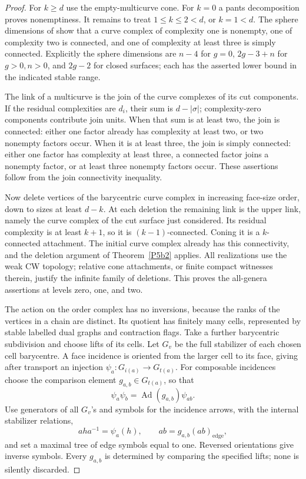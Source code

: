 \begin{proof}
For \(k\geq d\) use the empty-multicurve cone. For \(k=0\)
a pants decomposition proves nonemptiness. It remains to
treat \(1\leq k\leq2<d\), or \(k=1<d\).
The sphere dimensions of \citet[Chapter 4, Theorem 4.1]{Harer1988}
show that a curve complex of complexity one is nonempty, one of
complexity two is connected, and one of complexity at least three
is simply connected. Explicitly the sphere dimensions are \(n-4\)
for \(g=0\), \(2g-3+n\) for \(g>0,n>0\), and \(2g-2\)
for closed surfaces; each has the asserted lower bound
in the indicated stable range.

The link of a multicurve is the join of the curve complexes
of its cut components. If the residual complexities are
\(d_i\), their sum is \(d-|\sigma|\); complexity-zero
components contribute join units. When that sum is at
least two, the join is connected: either one factor
already has complexity at least two, or two nonempty
factors occur. When it is at least three, the join is
simply connected: either one factor has complexity at
least three, a connected factor joins a nonempty factor,
or at least three nonempty factors occur. These assertions
follow from the join connectivity inequality.

Now delete vertices of the barycentric curve complex in
increasing face-size order, down to sizes at least \(d-k\).
At each deletion the remaining link is the upper link,
namely the curve complex of the cut surface just considered.
Its residual complexity is at least \(k+1\), so it is
\((k-1)\)-connected. Coning it is a \(k\)-connected
attachment. The initial curve complex already has this
connectivity, and the deletion argument of
Theorem~\ref{P5b2} applies. All realizations use the weak
CW topology; relative cone attachments, or finite compact
witnesses therein, justify the infinite family of deletions.
This proves the all-genera assertions at levels zero,
one, and two.

The action on the order complex has no inversions, because
the ranks of the vertices in a chain are distinct.
Its quotient has finitely many cells, represented by
stable labelled dual graphs and contraction flags.
Take a further barycentric subdivision and choose lifts
of its cells. Let \(G_v\) be the full stabilizer of each
chosen cell barycentre. A face incidence is oriented
from the larger cell to its face, giving after transport
an injection \(\psi_a:G_{i(a)}\to G_{t(a)}\).
For composable incidences choose the comparison element
\(g_{a,b}\in G_{t(a)}\), so that
\[
                  \psi_a\psi_b
                 =\operatorname{Ad}(g_{a,b})\psi_{ab}.
\]
Use generators of all \(G_v\)'s and symbols for the
incidence arrows, with the internal stabilizer relations,
\[
 ah a^{-1}=\psi_a(h),\qquad
 ab=g_{a,b}(ab)_{\mathrm{edge}},
\]
and set a maximal tree of edge symbols equal to one.
Reversed orientations give inverse symbols.
Every \(g_{a,b}\) is determined by comparing the specified
lifts; none is silently discarded.


\end{proof}
